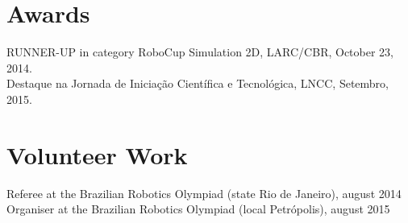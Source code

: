 \documentclass[margin, 10pt]{res} %
\begin{document}
\begin{resume}

\section{Awards} 
RUNNER-UP in category RoboCup Simulation 2D, LARC/CBR, October 23, 2014.\\
Destaque na Jornada de Iniciação Científica e Tecnológica, LNCC, Setembro, 2015.


\section{Volunteer Work}

Referee at the Brazilian Robotics Olympiad (state Rio de Janeiro), august 2014\\
Organiser at the Brazilian Robotics Olympiad (local Petrópolis), august 2015


\end{resume}
\end{document}
